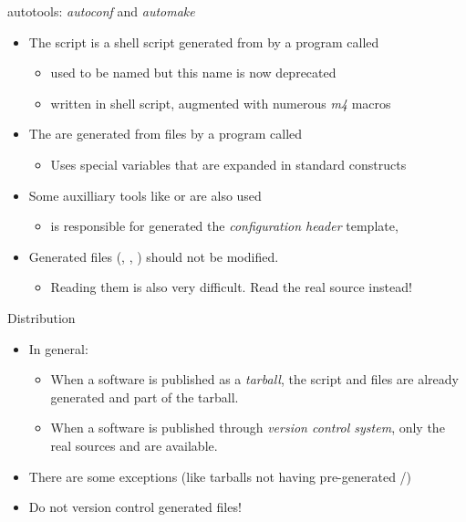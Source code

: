 \begin{frame}{autotools: {\em autoconf} and {\em automake}}
  \begin{itemize}
  \item The  script is a shell script generated from
     by a program called 
    \begin{itemize}
    \item {} used to be named  but
      this name is now deprecated
    \item written in shell script, augmented with numerous {\em m4}
      macros
    \end{itemize}
  \item The  are generated from 
    files by a program called 
    \begin{itemize}
    \item Uses special  variables that are expanded in
      standard  constructs
    \end{itemize}
  \item Some auxilliary tools like  or 
    are also used
    \begin{itemize}
    \item {} is responsible for generated the {\em
        configuration header} template, 
    \end{itemize}
  \item Generated files (, ,
    ) should not be modified.
    \begin{itemize}
    \item Reading them is also very difficult. Read the real source
      instead!
    \end{itemize}
  \end{itemize}
\end{frame}

\begin{frame}{Distribution}
  \begin{itemize}
  \item In general:
    \begin{itemize}
    \item When a software is published as a {\em tarball}, the
       script and  files are already
      generated and part of the tarball.
    \item When a software is published through {\em version control
        system}, only the real sources  and
       are available.
    \end{itemize}
  \item There are some exceptions (like tarballs not having
    pre-generated /)
  \item Do not version control generated files!
  \end{itemize}
\end{frame}

